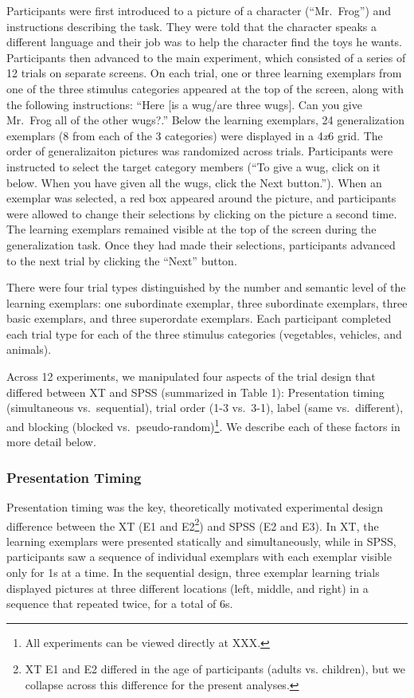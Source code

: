 \documentclass[english,floatsintext,man]{apa6}
\theoremstyle{definition}
\theoremstyle{definition}
\theoremstyle{remark}
\begin{document}
Participants were first introduced to a picture of a character
(\enquote{Mr.~Frog}) and instructions describing the task. They were
told that the character speaks a different language and their job was to
help the character find the toys he wants. Participants then advanced to
the main experiment, which consisted of a series of 12 trials on
separate screens. On each trial, one or three learning exemplars from
one of the three stimulus categories appeared at the top of the screen,
along with the following instructions: \enquote{Here {[}is a wug/are
three wugs{]}. Can you give Mr.~Frog all of the other wugs?.} Below the
learning exemplars, 24 generalization exemplars (8 from each of the 3
categories) were displayed in a 4\emph{x}6 grid. The order of
generalizaiton pictures was randomized across trials. Participants were
instructed to select the target category members (\enquote{To give a
wug, click on it below. When you have given all the wugs, click the Next
button.}). When an exemplar was selected, a red box appeared around the
picture, and participants were allowed to change their selections by
clicking on the picture a second time. The learning exemplars remained
visible at the top of the screen during the generalization task. Once
they had made their selections, participants advanced to the next trial
by clicking the \enquote{Next} button.

There were four trial types distinguished by the number and semantic
level of the learning exemplars: one subordinate exemplar, three
subordinate exemplars, three basic exemplars, and three superordate
exemplars. Each participant completed each trial type for each of the
three stimulus categories (vegetables, vehicles, and animals).

Across 12 experiments, we manipulated four aspects of the trial design
that differed between XT and SPSS (summarized in Table 1): Presentation
timing (simultaneous vs.~sequential), trial order (1-3 vs.~3-1), label
(same vs.~different), and blocking (blocked
vs.~pseudo-random)\footnote{All experiments can be viewed directly at XXX.}.
We describe each of these factors in more detail below.

\subsubsection{Presentation Timing}\label{presentation-timing}

Presentation timing was the key, theoretically motivated experimental
design difference between the XT (E1 and
E2\footnote{XT E1 and E2 differed in the age of participants (adults vs. children), but we collapse across this difference for the present analyses.})
and SPSS (E2 and E3). In XT, the learning exemplars were presented
statically and simultaneously, while in SPSS, participants saw a
sequence of individual exemplars with each exemplar visible only for 1s
at a time. In the sequential design, three exemplar learning trials
displayed pictures at three different locations (left, middle, and
right) in a sequence that repeated twice, for a total of 6s.
\end{document}
